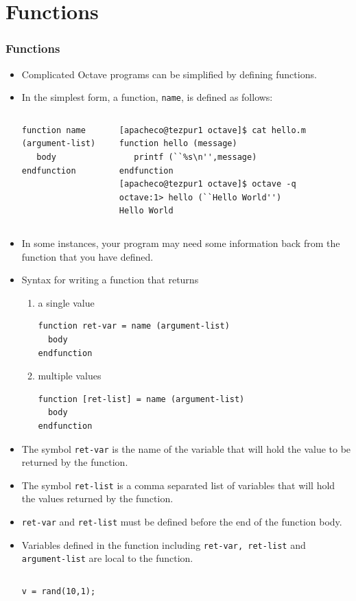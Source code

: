 \documentclass[slidestop,mathserif,compress,xcolor=svgnames]{beamer}
\begin{document}
\section{Functions}
\begin{frame}
  \frametitle{\small Functions}
  \begin{itemize}
    \item Complicated Octave programs can be simplified by defining functions.
    \item In the simplest form, a function, \texttt{name}, is defined as follows:
   {\tiny
     \begin{columns}
       \column{4cm}
       \begin{verbatim}
function name (argument-list)
   body
endfunction
       \end{verbatim}
       \column{4cm}
       \begin{verbatim}
[apacheco@tezpur1 octave]$ cat hello.m 
function hello (message)
   printf (``%s\n'',message)                                                     
endfunction
[apacheco@tezpur1 octave]$ octave -q
octave:1> hello (``Hello World'')
Hello World
       \end{verbatim}
     \end{columns}
   }
   \item In some instances, your program may need some information back from the function that you have defined.
   \item Syntax for writing a function that returns
   \begin{enumerate}
     \item a single value
     {\tiny
       \begin{verbatim}
function ret-var = name (argument-list)
  body
endfunction
       \end{verbatim}
     }
     \item multiple values
       {\tiny
       \begin{verbatim}
function [ret-list] = name (argument-list)
  body
endfunction
       \end{verbatim}
       }
   \end{enumerate}
   \item The symbol \texttt{ret-var} is the name of the variable that will hold the value to be returned by the function.
   \item The symbol \texttt{ret-list} is a comma separated list of variables that will hold the values returned by the function.
   \item \texttt{ret-var} and \texttt{ret-list} must be defined before the end of the function body.
   \item Variables defined in the function including \texttt{ret-var, ret-list} and \texttt{argument-list} are local to the function.
   {\tiny
     \begin{columns}
       \column{4cm}
       \begin{verbatim}
v = rand(10,1);


\end{verbatim}
\end{columns}}
\end{itemize}
\end{frame}
\end{document}
